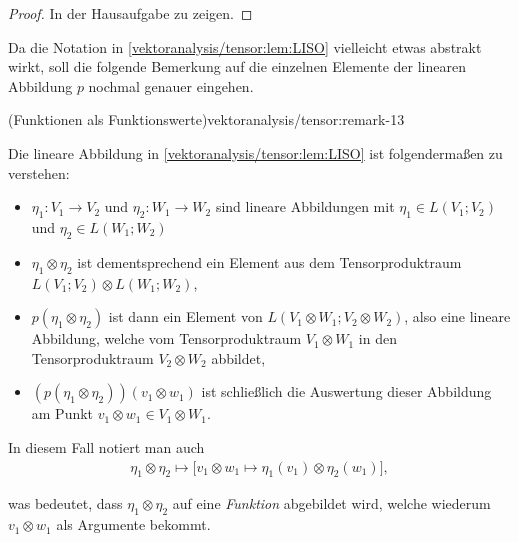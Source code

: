 \documentclass[letterpaper,10pt,english]{jupyterBook}
\begin{document}
\begin{proof}
 In der Hausaufgabe zu zeigen.
\end{proof}

\par
Da die Notation in \cref{vektoranalysis/tensor:lem:LISO} vielleicht etwas abstrakt wirkt, soll die folgende Bemerkung auf die einzelnen Elemente der linearen Abbildung \(p\) nochmal genauer eingehen.
\begin{remark}{(Funktionen als Funktionswerte)}{vektoranalysis/tensor:remark-13}



\par
Die lineare Abbildung in \cref{vektoranalysis/tensor:lem:LISO} ist folgendermaßen zu verstehen:
\begin{itemize}
\item {} 
\par
\(\eta_1:V_1\rightarrow V_2\) und \(\eta_2: W_1 \rightarrow W_2\) sind lineare Abbildungen mit \(\eta_1 \in L(V_1; V_2)\) und \(\eta_2 \in L(W_1; W_2)\)

\item {} 
\par
\(\eta_1 \otimes \eta_2\) ist dementsprechend ein Element aus dem Tensorproduktraum \(L(V_1; V_2)\otimes L(W_1; W_2)\),

\item {} 
\par
\(p(\eta_1\otimes\eta_2)\) ist dann ein Element von \(L(V_1\otimes W_1; V_2\otimes W_2)\), also eine lineare Abbildung, welche vom Tensorproduktraum \(V_1\otimes W_1\) in den Tensorproduktraum \(V_2\otimes W_2\) abbildet,

\item {} 
\par
\((p(\eta_1\otimes\eta_2))(v_1\otimes w_1)\) ist schließlich die Auswertung dieser Abbildung am Punkt \(v_1\otimes w_1\in V_1\otimes W_1\).

\end{itemize}

\par
In diesem Fall notiert man auch
\begin{align*}
\eta_1\otimes\eta_2 \mapsto 
\big[
v_1\otimes w_1\mapsto \eta_1(v_1) \otimes \eta_2(w_1)
\big],
\end{align*}
\par
was bedeutet, dass \(\eta_1\otimes\eta_2\) auf eine \emph{Funktion} abgebildet wird, welche wiederum \(v_1\otimes w_1\) als Argumente bekommt.
\end{remark}
\end{document}
